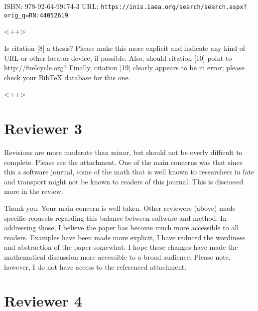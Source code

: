 \documentclass[answers,12pt]{exam}
\begin{document}
\begin{questions}
ISBN: 978-92-64-99174-3
URL: \verb|https://inis.iaea.org/search/search.aspx?orig_q=RN:44052619|
\begin{solution}
<++>
\end{solution}

\question Is citation [8] a thesis? Please make this more explicit and indicate any kind of URL or other locator device, if possible. Also, should citation [10] point to http://fuelcycle.org? Finally, citation [19] clearly appears to be in error; please check your BibTeX database for this one.
\begin{solution}
<++>
\end{solution}

\section*{Reviewer 3}

\question   Revisions are more moderate than minor, but should not be overly difficult
to complete. Please see the attachment. One of the main concerns was that since
this a software journal, some of the math that is well known to researchers in
fate and transport might not be known to readers of this journal. This is
discussed more in the review.
\begin{solution}
Thank you. Your main concern is well taken. Other reviewers (above) made 
        specific requests regarding this balance between software and method. 
        In addressing those, I believe the paper has become much more 
        accessible to all readers. Examples have been made more explicit, I 
        have reduced the wordiness and abstraction of the paper somewhat. I 
        hope these changes have made the mathematical discussion more 
        accessible to a broad audience. Please note, however, I do not have 
        access to the referenced attachment.
\end{solution}

\section*{Reviewer 4}


\end{questions}
\end{document}
